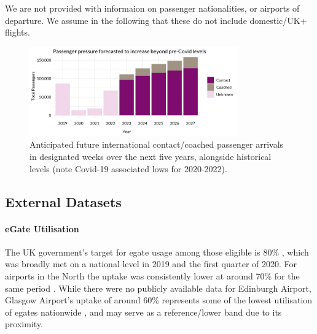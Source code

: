\documentclass[10pt]{article}
\begin{document}


We are not provided with informaion on passenger nationalities, or airports of departure. We assume in the following that these do not include domestic/UK+ flights. 

\begin{figure}[!ht]
    \centering
    \includegraphics[width=0.8\textwidth]{figures/future_passenger_burden_fig.png}
     \caption{Anticipated future international contact/coached passenger arrivals in designated weeks over the next five years, alongside historical levels (note Covid-19 associated lows for 2020-2022).  } \label{fig:future_passenger_burden}
\end{figure}

\subsection{External Datasets} \label{sec:observed_arrivals_data}

\paragraph{eGate Utilisation}
The UK government's target for \gls{egate} usage among those eligible is 80\% \cite{UK_border_2025}, which was broadly met on a national level in 2019 and the first quarter of 2020. For airports in the North the uptake was consistently lower at around 70\% for the same period \cite{Inspection_eGates}. While there were no publicly available data for Edinburgh Airport, Glasgow Airport's uptake of around 60\% represents some of the lowest utilisation of \glspl{egate} nationwide \cite{Inspection_eGates}, and may serve as a reference/lower band due to its proximity.
\end{document}
